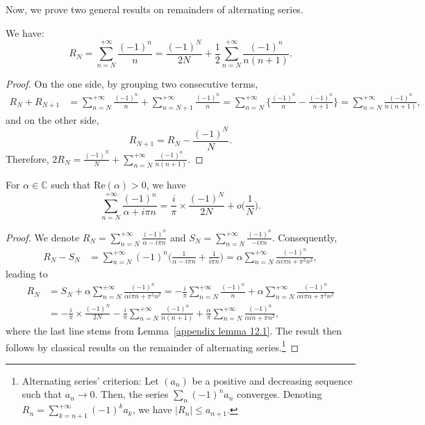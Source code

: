 Now, we prove two general results on remainders of alternating series. 

\begin{lemma}\label{appendix lemma 12.1}
We have:
    \begin{equation*}
        R_N = \sum_{n=N}^{+\infty}\frac{(-1)^n}{n} = \frac{(-1)^N}{2N} + \frac{1}{2}\sum_{n=N}^{+\infty}\frac{(-1)^n}{n(n+1)}.
    \end{equation*}
\end{lemma}

\begin{proof}
    On the one side,  by grouping two consecutive terms,
    \begin{align*}
    R_N + R_{N+1} &= \sum_{n=N}^{+\infty}\frac{(-1)^n}{n} + \sum_{n=N+1}^{+\infty}\frac{(-1)^n}{n}  = \sum_{n=N}^{+\infty} \Big\{ \frac{(-1)^n}{n} - \frac{(-1)^n}{n+1} \Big\}= \sum_{n=N}^{+\infty}\frac{(-1)^n}{n(n+1)},
    \end{align*}
and on the other side, 
\[
R_{N+1} = R_N - \frac{(-1)^N}{N}.
\]
Therefore, \( \displaystyle
2R_N = \frac{(-1)^N}{N} + \sum_{n=N}^{+\infty}\frac{(-1)^n}{n(n+1)}.
\)
\end{proof}
    

\begin{lemma}\label{appendix lemma 12.2}
For $\alpha\in\mathbb{C}$ such that Re$(\alpha)>0$,
we have
\begin{equation*}
    \sum_{n=N}^{+\infty} \frac{(-1)^n}{\alpha + i\pi n} = \frac{i}{\pi}\times\frac{(-1)^N}{2N} + o\big(\frac{1}{N}\big).
\end{equation*}
\end{lemma}

\begin{proof}
    We denote $R_N = \sum_{n=N}^{+\infty}\frac{(-1)^n}{\alpha - i\pi n}$ and $S_N = \sum_{n=N}^{+\infty}\frac{(-1)^n}{-i\pi n}$. Consequently, 
    \begin{align*}
        R_N - S_N &= \sum_{n=N}^{+\infty}(-1)^n\big(\frac{1}{\alpha - i\pi n} + \frac{1}{i\pi n}\big) = \alpha\sum_{n=N}^{+\infty}\frac{(-1)^n}{\alpha i\pi n + \pi^2 n^2},
        \end{align*}
        leading to
        \begin{align*} R_N &= S_N + \alpha\sum_{n=N}^{+\infty}\frac{(-1)^n}{\alpha i\pi n + \pi^2n^2}= -\frac{i}{\pi}\sum_{n=N}^{+\infty}\frac{(-1)^n}{n} + \alpha\sum_{n=N}^{+\infty}\frac{(-1)^n}{\alpha i\pi n + \pi^2n^2}\\
        &= -\frac{i}{\pi}\times\frac{(-1)^N}{2N} - \frac{i}{\pi}\sum_{n=N}^{+\infty}\frac{(-1)^n}{n(n+1)} + \frac{\alpha}{\pi}\sum_{n=N}^{+\infty}\frac{(-1)^n}{\alpha in + \pi n^2}, 
    \end{align*}
    where the last line stems from Lemma~\ref{appendix lemma 12.1}. The result then follows by classical results on the remainder of alternating series.\footnote{Alternating series' criterion: Let $(a_n)$ be a positive and decreasing sequence such that $a_n\rightarrow 0$. Then, the series $\sum_n(-1)^na_n$ converges. Denoting $R_n = \sum_{k=n+1}^{+\infty}(-1)^ka_k$, we have $\vert R_n\vert\leq a_{n+1}$.}
\end{proof}


